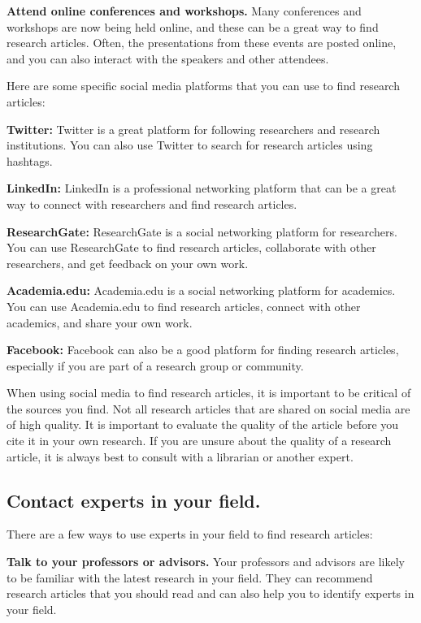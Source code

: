 \documentclass[
  b5paper]{book}
\begin{document}
\textbf{Attend online conferences and workshops.} Many conferences and workshops are now being held online, and these can be a great way to find research articles. Often, the presentations from these events are posted online, and you can also interact with the speakers and other attendees.

Here are some specific social media platforms that you can use to find research articles:

\textbf{Twitter:} Twitter is a great platform for following researchers and research institutions. You can also use Twitter to search for research articles using hashtags.

\textbf{LinkedIn:} LinkedIn is a professional networking platform that can be a great way to connect with researchers and find research articles.

\textbf{ResearchGate:} ResearchGate is a social networking platform for researchers. You can use ResearchGate to find research articles, collaborate with other researchers, and get feedback on your own work.

\textbf{Academia.edu:} Academia.edu is a social networking platform for academics. You can use Academia.edu to find research articles, connect with other academics, and share your own work.

\textbf{Facebook:} Facebook can also be a good platform for finding research articles, especially if you are part of a research group or community.

When using social media to find research articles, it is important to be critical of the sources you find. Not all research articles that are shared on social media are of high quality. It is important to evaluate the quality of the article before you cite it in your own research. If you are unsure about the quality of a research article, it is always best to consult with a librarian or another expert.

\hypertarget{contact-experts-in-your-field.}{%
\subsection*{Contact experts in your field.}\label{contact-experts-in-your-field.}}

There are a few ways to use experts in your field to find research articles:

\textbf{Talk to your professors or advisors.} Your professors and advisors are likely to be familiar with the latest research in your field. They can recommend research articles that you should read and can also help you to identify experts in your field.
\end{document}
